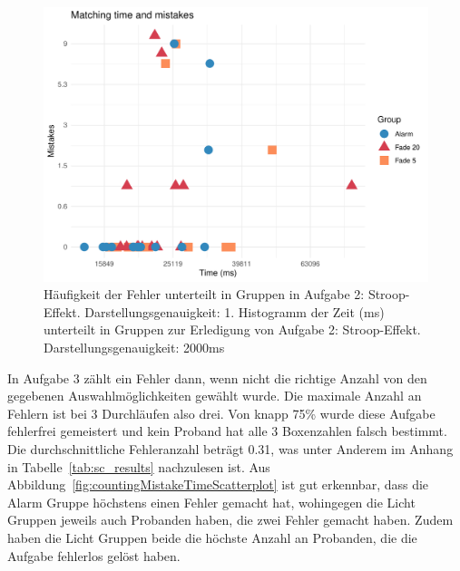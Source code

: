 \begin{figure}[H]
	\centering
	\includegraphics[width=\textwidth]{./_StudyResults/matchingMisTimeScat}
	\caption{Häufigkeit der Fehler unterteilt in Gruppen in Aufgabe 2: Stroop-Effekt. Darstellungsgenauigkeit: 1. Histogramm der Zeit (ms) unterteilt in Gruppen zur Erledigung von Aufgabe 2: Stroop-Effekt. Darstellungsgenauigkeit: 2000ms}
	\label{fig:matchingMistakeTimeScatterplot}
\end{figure}

In Aufgabe 3 zählt ein Fehler dann, wenn nicht die richtige Anzahl von den gegebenen Auswahlmöglichkeiten gewählt wurde. Die maximale Anzahl an Fehlern ist bei 3 Durchläufen also drei.
Von knapp 75\% wurde diese Aufgabe fehlerfrei gemeistert und kein Proband hat alle 3 Boxenzahlen falsch bestimmt. Die durchschnittliche Fehleranzahl beträgt 0.31, was unter Anderem im Anhang in Tabelle~\ref{tab:sc_results} nachzulesen ist.
Aus Abbildung~\ref{fig:countingMistakeTimeScatterplot} ist gut erkennbar, dass die Alarm Gruppe höchstens einen Fehler gemacht hat, wohingegen die Licht Gruppen jeweils auch Probanden haben, die zwei Fehler gemacht haben. Zudem haben die Licht Gruppen beide die höchste Anzahl an Probanden, die die Aufgabe fehlerlos gelöst haben.

